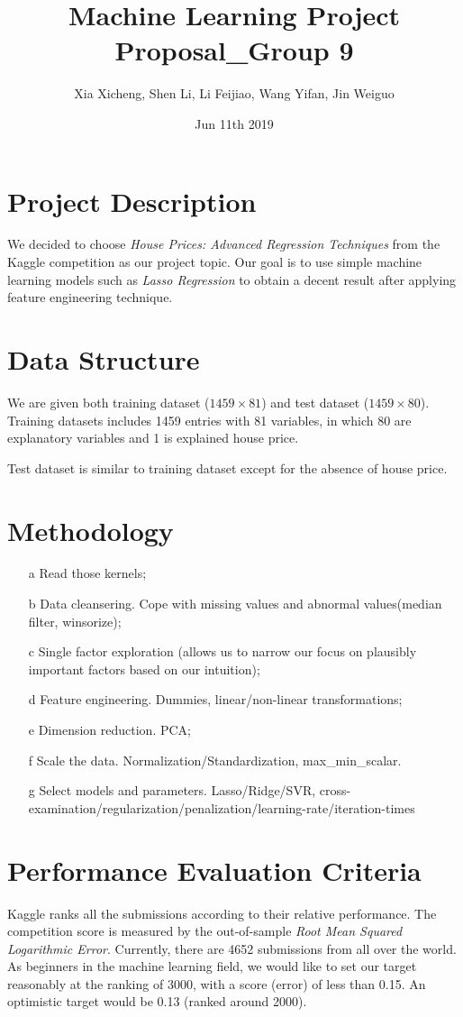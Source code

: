 \documentclass{article}
\title{Machine Learning Project Proposal\_Group 9}
\date{Jun 11th 2019}
\author{Xia Xicheng, Shen Li, Li Feijiao, Wang Yifan, Jin Weiguo}
\begin{document}
	\maketitle
\section{Project Description}
We decided to choose \textit{House Prices: Advanced Regression Techniques} from the Kaggle competition as our project topic. Our goal is to use simple machine learning models such as \textit{Lasso Regression} to obtain a decent result after applying feature engineering technique.\\

\section{Data Structure}
We are given both training dataset ($1459\times 81$) and test dataset ($1459\times 80$). Training datasets includes 1459 entries with 81 variables, in which 80 are explanatory variables and 1 is explained house price. \

\noindent Test dataset is similar to training dataset except for the absence of house price.

\section{Methodology}
\begin{itemize}
	\item[a] Read those kernels;
	\item[b] Data cleansering. Cope with missing values and abnormal values(median filter, winsorize);
	\item[c] Single factor exploration (allows us to narrow our focus on plausibly important factors based on our intuition);
	\item[d] Feature engineering. Dummies, linear/non-linear transformations;
	\item[e] Dimension reduction. PCA;
	\item[f] Scale the data. Normalization/Standardization, max\_min\_scalar.
	\item[g] Select models and parameters. Lasso/Ridge/SVR, cross-examination/regularization/penalization/learning-rate/iteration-times
\end{itemize}


\section{Performance Evaluation Criteria}
Kaggle ranks all the submissions according to their relative performance. The competition score is measured by the out-of-sample \textit{Root Mean Squared Logarithmic Error}. Currently, there are 4652 submissions from all over the world. As beginners in the machine learning field, we would like to set our target reasonably at the ranking of 3000, with a score (error) of less than 0.15. An optimistic target would be 0.13 (ranked around 2000).
\end{document}
